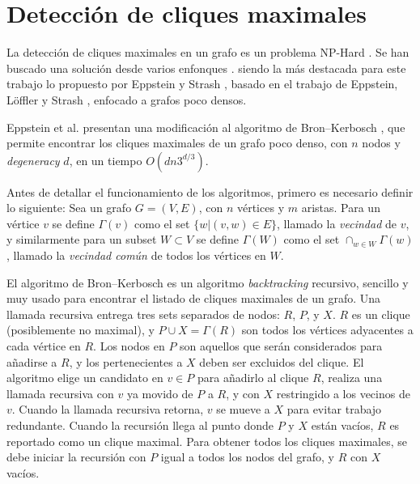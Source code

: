 \section{Detección de cliques maximales} \label{sec:Cliques}
La detección de cliques maximales en un grafo es un problema NP-Hard \cite{karp1972reducibility}. Se han buscado una solución desde varios enfonques \cite{bron1973algorithm, eblen2012maximum, hendrix2010theoretical, bomze1999maximum, eppstein2010listing, eppstein2011listing}. siendo la más destacada para este trabajo lo propuesto por Eppstein y Strash \cite{eppstein2011listing}, basado en el trabajo de Eppstein, Löffler y Strash \cite{eppstein2010listing}, enfocado a grafos poco densos.

Eppstein et al. \cite{eppstein2010listing} presentan una modificación al algoritmo de Bron–Kerbosch \cite{bron1973algorithm}, que permite encontrar los cliques maximales de un grafo poco denso, con $n$ nodos y \textit{degeneracy} $d$, en un tiempo $O(dn3^{d/3})$.

Antes de detallar el funcionamiento de los algoritmos, primero es necesario definir lo siguiente: Sea un grafo $G = (V, E)$, con $n$ vértices y $m$ aristas. Para un vértice $v$ se define $\Gamma(v)$ como el set $\{w | (v, w) \in E\}$, llamado la \textit{vecindad} de $v$, y similarmente para un subset $W \subset V$ se define $\Gamma(W)$ como el set $\cap_{w \in W} \Gamma(w)$, llamado la \textit{vecindad común} de todos los vértices en $W$.

El algoritmo de Bron–Kerbosch \cite{bron1973algorithm} es un algoritmo \textit{backtracking} recursivo, sencillo y muy usado para encontrar el listado de cliques maximales de un grafo. Una llamada recursiva entrega tres sets separados de nodos: $R$, $P$, y $X$. $R$ es un clique (posiblemente no maximal), y $P \cup X = \Gamma(R)$ son todos los vértices adyacentes a cada vértice en $R$. Los nodos en $P$ son aquellos que serán considerados para añadirse a $R$, y los pertenecientes a $X$ deben ser excluidos del clique. El algoritmo elige un candidato en $v \in P$ para añadirlo al clique $R$, realiza una llamada recursiva con $v$ ya movido de $P$ a $R$, y con $X$ restringido a los vecinos de $v$. Cuando la llamada recursiva retorna, $v$ se mueve a $X$ para evitar trabajo redundante. Cuando la recursión llega al punto donde $P$ y $X$ están vacíos, $R$ es reportado como un clique maximal. Para obtener todos los cliques maximales, se debe iniciar la recursión con $P$ igual a todos los nodos del grafo, y $R$ con $X$ vacíos.

